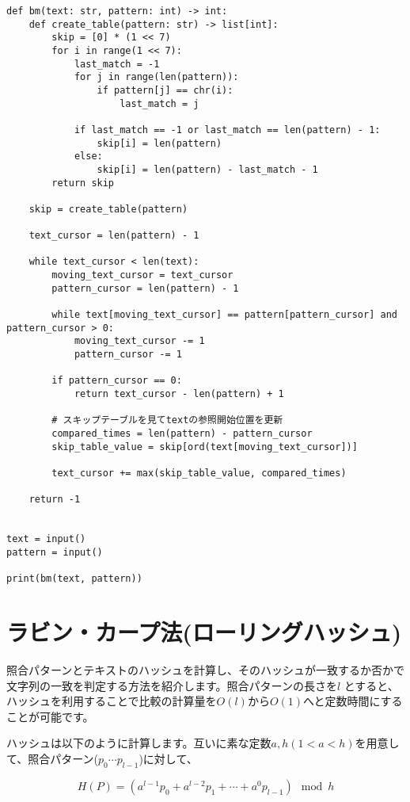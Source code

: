 \documentclass{jlreq}
\begin{document}
\begin{lstlisting}[caption=BM法の実装, frame=TRBL, label={BM}]
def bm(text: str, pattern: int) -> int:
	def create_table(pattern: str) -> list[int]:
		skip = [0] * (1 << 7)
		for i in range(1 << 7):
			last_match = -1
			for j in range(len(pattern)):
				if pattern[j] == chr(i):
					last_match = j
			
			if last_match == -1 or last_match == len(pattern) - 1:
				skip[i] = len(pattern)
			else:
				skip[i] = len(pattern) - last_match - 1
		return skip

	skip = create_table(pattern)

	text_cursor = len(pattern) - 1
	
	while text_cursor < len(text):
		moving_text_cursor = text_cursor
		pattern_cursor = len(pattern) - 1
  
		while text[moving_text_cursor] == pattern[pattern_cursor] and pattern_cursor > 0:
			moving_text_cursor -= 1
			pattern_cursor -= 1
   
		if pattern_cursor == 0:
			return text_cursor - len(pattern) + 1
		
		# スキップテーブルを見てtextの参照開始位置を更新
		compared_times = len(pattern) - pattern_cursor
		skip_table_value = skip[ord(text[moving_text_cursor])]
  
		text_cursor += max(skip_table_value, compared_times)
	
	return -1
  
  
text = input()
pattern = input()

print(bm(text, pattern))

\end{lstlisting}

\newpage

\section{ラビン・カープ法(ローリングハッシュ)}

照合パターンとテキストのハッシュを計算し、そのハッシュが一致するか否かで文字列の一致を判定する方法を紹介します。照合パターンの長さを$l$
とすると、ハッシュを利用することで比較の計算量を$O(l)$から$O(1)$へと定数時間にすることが可能です。

ハッシュは以下のように計算します。互いに素な定数$a, h(1 < a < h)$を用意して、照合パターン($p_0 \cdots p_{l-1}$)に対して、

\begin{equation}
    H(P) = (a^{l-1} p_0 + a^{l-2} p_1 + \cdots + a^0 p_{l-1}) \mod h
\end{equation}
\end{document}
